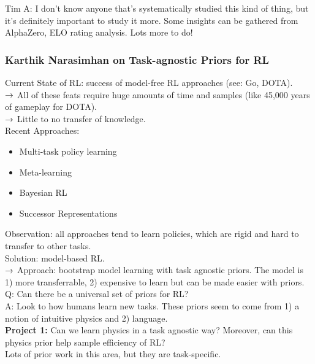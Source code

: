 Tim A: I don't know anyone that's systematically studied this kind of thing, but it's definitely important to study it more. Some insights can be gathered from AlphaZero, ELO rating analysis. Lots more to do! 

\subsubsection{Karthik Narasimhan on Task-agnostic Priors for RL}

Current State of RL: success of model-free RL approaches (see: Go, DOTA). \\

$\rightarrow$ All of these feats require huge amounts of time and samples (like 45,000 years of gameplay for DOTA). \\

$\rightarrow$ Little to no transfer of knowledge. \\

Recent Approaches:
\begin{itemize}
    \item Multi-task policy learning
    \item Meta-learning
    \item Bayesian RL
    \item Successor Representations
\end{itemize}

Observation: all approaches tend to learn policies, which are rigid and hard to transfer to other tasks. \\

Solution: model-based RL.\\

$\rightarrow$ Approach: bootstrap model learning with task agnostic priors. The model is 1) more transferrable, 2) expensive to learn but can be made easier with priors. \\

Q: Can there be a universal set of priors for RL? \\

A: Look to how humans learn new tasks. These priors seem to come from 1) a notion of intuitive physics and 2) language. \\

{\bf Project 1:} Can we learn physics in a task agnostic way? Moreover, can this physics prior help sample efficiency of RL? \\

Lots of prior work in this area, but they are task-specific. \\

